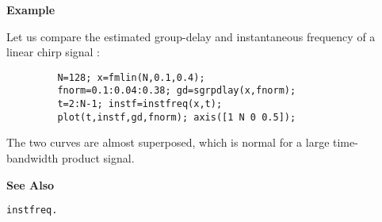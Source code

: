 {\bf \large \sf Example}\\
\hspace*{1.5cm}
\begin{minipage}[t]{13.5cm}
Let us compare the estimated group-delay and instantaneous frequency of a
linear chirp signal : 
\begin{verbatim}
         N=128; x=fmlin(N,0.1,0.4);
         fnorm=0.1:0.04:0.38; gd=sgrpdlay(x,fnorm); 
         t=2:N-1; instf=instfreq(x,t);
         plot(t,instf,gd,fnorm); axis([1 N 0 0.5]); 
\end{verbatim}
The two curves are almost superposed, which is normal for a large
time-bandwidth product signal.
\end{minipage}
\vspace*{.5cm}

{\bf \large \sf See Also}\\
\hspace*{1.5cm}
\begin{minipage}[t]{13.5cm}
\begin{verbatim}
instfreq.
\end{verbatim}
\end{minipage}
